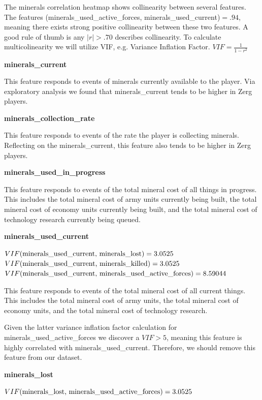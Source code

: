 \documentclass[a4paper,12pt]{report}
\newcommand{\msection}[1]{\noindent\textbf{#1}}
\begin{document}
The minerals correlation heatmap shows collinearity between several features. The features (minerals\_used\_active\_forces, minerals\_used\_current)$ = .94$, meaning there exists strong positive collinearity between these two features. A good rule of thumb is any $|r| > .70$ describes collinearity. To calculate multicolinearity we will utilize VIF, e.g. Variance Inflation Factor. $VIF = \frac{1}{1-r^2}$

\msection{minerals\_current}

This feature responds to events of minerals currently available to the player. Via exploratory analysis we found that minerals\_current tends to be higher in Zerg players.

\msection{minerals\_collection\_rate}

This feature responds to events of the rate the player is collecting minerals. Reflecting on the minerals\_current, this feature also tends to be higher in Zerg players.

\msection{minerals\_used\_in\_progress}

This feature responds to events of the total mineral cost of all things in progress. This includes the total mineral cost of army units currently being built, the total mineral cost of economy units currently being built, and the total mineral cost of technology research currently being queued.

\msection{minerals\_used\_current}

$VIF(\text{minerals\_used\_current, minerals\_lost}) = \pgfmathparse{1/(1-(-.82)^2)}\pgfmathresult$ \\
$VIF(\text{minerals\_used\_current, minerals\_killed}) = \pgfmathparse{1/(1-(-.82)^2)}\pgfmathresult$ \\
$VIF(\text{minerals\_used\_current, minerals\_used\_active\_forces}) = \pgfmathparse{1/(1-(.94)^2)}\pgfmathresult$

This feature responds to events of the total mineral cost of all current things. This includes the total mineral cost of army units, the total mineral cost of economy units, and the total mineral cost of technology research.

Given the latter variance inflation factor calculation for minerals\_used\_active\_forces we discover a $VIF > 5$, meaning this feature is highly correlated with minerals\_used\_current. Therefore, we should remove this feature from our dataset.

\msection{minerals\_lost}

$VIF(\text{minerals\_lost, minerals\_used\_active\_forces}) = \pgfmathparse{1/(1-(-.82)^2)}\pgfmathresult$
\end{document}

